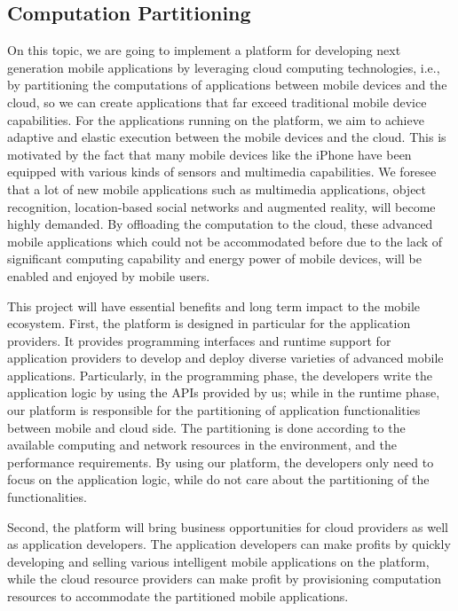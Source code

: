 
\subsection{Computation Partitioning}

On this topic, we are going to implement a platform for developing next generation mobile applications by leveraging cloud computing technologies, i.e., by partitioning the computations of applications between mobile devices and the cloud, so we can create applications that far exceed traditional mobile device capabilities. For the applications running on the platform, we aim to achieve adaptive and elastic execution between the mobile devices and the cloud. This is motivated by the fact that many mobile devices like the iPhone have been equipped with various kinds of sensors and multimedia capabilities. We foresee that a lot of new mobile applications such as multimedia applications, object recognition, location-based social networks and augmented reality, will become highly demanded. By offloading the computation to the cloud, these advanced mobile applications which could not be accommodated before due to the lack of significant computing capability and energy power of mobile devices, will be enabled and enjoyed by mobile users.

This project will have essential benefits and long term impact to the mobile ecosystem. First, the platform is designed in particular for the application providers. It provides programming interfaces and runtime support for application providers to develop and deploy diverse varieties of advanced mobile applications. Particularly, in the programming phase, the developers write the application logic by using the APIs provided by us; while in the runtime phase, our platform is responsible for the partitioning of application functionalities between mobile and cloud side. The partitioning is done according to the available computing and network resources in the environment, and the performance requirements. By using our platform, the developers only need to focus on the application logic, while do not care about the partitioning of the functionalities.

Second, the platform will bring business opportunities for cloud providers as well as application developers. The application developers can make profits by quickly developing and selling various intelligent mobile applications on the platform, while the cloud resource providers can make profit by provisioning computation resources to accommodate the partitioned mobile applications.

